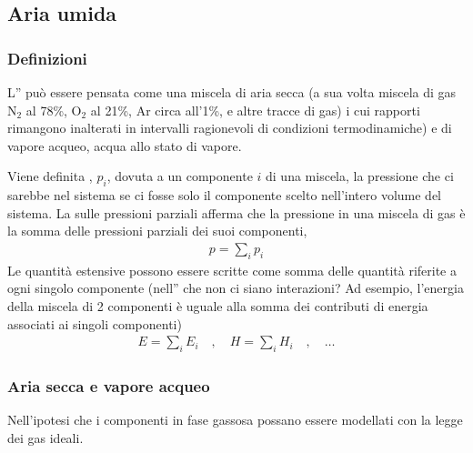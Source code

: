 \documentclass[letterpaper,10pt,italian]{jupyterBook}
\begin{document}
\sphinxstepscope


\subsection{Aria umida}
\label{\detokenize{ch/thermodynamics/humid-air:aria-umida}}\label{\detokenize{ch/thermodynamics/humid-air:physics-hs-thermodynamics-matter-humid-air}}\label{\detokenize{ch/thermodynamics/humid-air::doc}}

\subsubsection{Definizioni}
\label{\detokenize{ch/thermodynamics/humid-air:definizioni}}
\sphinxAtStartPar
L” può essere pensata come una miscela di aria secca (a sua volta miscela di gas N\(_2\) al 78\%, O\(_2\) al 21\%, Ar circa all’1\%, e altre tracce di gas) i cui rapporti rimangono inalterati in intervalli ragionevoli di condizioni termodinamiche) e di vapore acqueo, acqua allo stato di vapore.

\sphinxAtStartPar
Viene definita , \(p_i\), dovuta a un componente \(i\) di una miscela, la pressione che ci sarebbe nel sistema se ci fosse solo il componente scelto nell’intero volume del sistema. La  sulle pressioni parziali afferma che la pressione in una miscela di gas è la somma delle pressioni parziali dei suoi componenti,
\begin{equation*}
\begin{split}p = \sum_i p_i\end{split}
\end{equation*}
\sphinxAtStartPar
Le quantità estensive possono essere scritte come somma delle quantità riferite a ogni singolo componente (nell” che non ci siano interazioni? Ad esempio, l’energia della miscela di 2 componenti è uguale alla somma dei contributi di energia associati ai singoli componenti)
\begin{equation*}
\begin{split}E = \sum_i E_i \quad , \quad H = \sum_i H_i \quad , \quad \dots\end{split}
\end{equation*}

\subsubsection{Aria secca e vapore acqueo}
\label{\detokenize{ch/thermodynamics/humid-air:aria-secca-e-vapore-acqueo}}
\sphinxAtStartPar
Nell’ipotesi che i componenti in fase gassosa possano essere modellati con la legge dei gas ideali.
\end{document}
